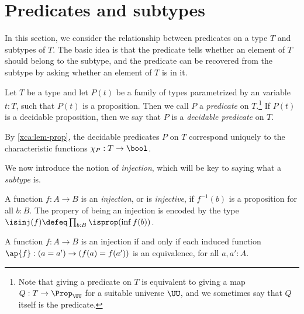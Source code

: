 \section{Predicates and subtypes}
\label{sec:subtype}

In this section, we consider the relationship between predicates on a type $T$ and subtypes of $T$.  The basic idea is that the predicate tells
whether an element of $T$ should belong to the subtype, and the predicate can be recovered from the subtype by asking whether an element of $T$
is in it.

\begin{definition}\label{def:predicate}
  Let $T$ be a type and let $P(t)$ be a family of types parametrized by an variable $t:T$, such that $P(t)$ is a proposition.
  Then we call $P$ a \emph{predicate} on $T$.\footnote{%
    Note that giving a predicate on $T$ is
    equivalent to giving a map $Q: T\to\Prop_\UU$ for a suitable universe $\UU$,
    and we sometimes say that $Q$ itself is the predicate.}
  If $P(t)$ is a decidable proposition,
  then we say that $P$ is a \emph{decidable predicate} on $T$.
\end{definition}

By \cref{xca:lem-prop}, the decidable predicates $P$ on $T$
correspond uniquely to the characteristic functions $\chi_P:T\to\bool$.

We now introduce the notion of \emph{injection}, which will be key to saying what a \emph{subtype} is.

\begin{definition}\label{def:injection}
  A function $f:A\to B$ is an \emph{injection}, or is \emph{injective},
  if $f^{-1}(b)$ is a proposition for all $b:B$.  The propery of being an injection is encoded by
  the type $\isinj(f) \defeq \prod_{b:B} \isprop(\inf f (b))$.
\end{definition}

\begin{lemma}\label{lem:inj-ap}
  A function $f:A\to B$ is an injection if and only if
  each induced function
  $\ap{f}: (a=a') \to (f(a)=f(a'))$ is an equivalence,
  for all $a,a':A$.
\end{lemma}

